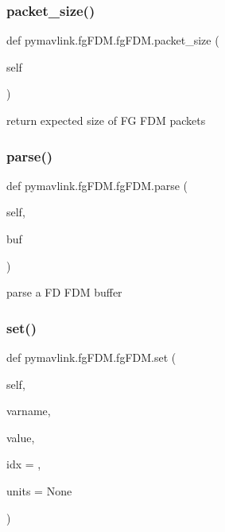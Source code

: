 \subsubsection{\texorpdfstring{packet\+\_\+size()}{packet\_size()}}
{\footnotesize\ttfamily def pymavlink.\+fg\+F\+D\+M.\+fg\+F\+D\+M.\+packet\+\_\+size (\begin{DoxyParamCaption}\item[{}]{self }\end{DoxyParamCaption})}

\begin{DoxyVerb}return expected size of FG FDM packets\end{DoxyVerb}
 \mbox{\label{classpymavlink_1_1fgFDM_1_1fgFDM_a706a022185739c6b22a0e5ccdaedf886}} 
\subsubsection{\texorpdfstring{parse()}{parse()}}
{\footnotesize\ttfamily def pymavlink.\+fg\+F\+D\+M.\+fg\+F\+D\+M.\+parse (\begin{DoxyParamCaption}\item[{}]{self,  }\item[{}]{buf }\end{DoxyParamCaption})}

\begin{DoxyVerb}parse a FD FDM buffer\end{DoxyVerb}
 \mbox{\label{classpymavlink_1_1fgFDM_1_1fgFDM_a850f093cb48104e97a5176e79390ac85}} 
\subsubsection{\texorpdfstring{set()}{set()}}
{\footnotesize\ttfamily def pymavlink.\+fg\+F\+D\+M.\+fg\+F\+D\+M.\+set (\begin{DoxyParamCaption}\item[{}]{self,  }\item[{}]{varname,  }\item[{}]{value,  }\item[{}]{idx = {},  }\item[{}]{units = {\ttfamily None} }\end{DoxyParamCaption})}

